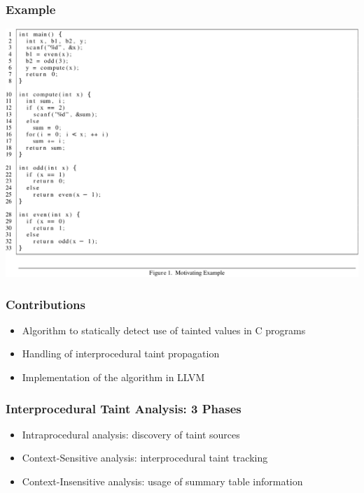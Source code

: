 \documentclass[xcolor=dvipsnames]{beamer}
\begin{document}
\begin{frame}
  \frametitle{Example} 
    {\small
	\begin{center}
	\includegraphics[scale=0.55]{example}
	\end{center}   
	}
\end{frame}

\begin{frame}
  \frametitle{Contributions} 
	{\Large
	\begin{itemize}
	\item Algorithm to statically detect use of tainted values in C programs
   	\vspace{0.5cm}
	\item Handling of interprocedural taint propagation
   	\vspace{0.5cm}   	
	\item Implementation of the algorithm in LLVM
	\end{itemize}
	}
\end{frame}

\begin{frame}
  \frametitle{Interprocedural Taint Analysis: 3 Phases} 
	{\Large
	\begin{itemize}
	\item Intraprocedural analysis: discovery of taint sources
   	\vspace{0.5cm}		
	\item Context-Sensitive analysis: interprocedural taint tracking
   	\vspace{0.5cm}		   	
	\item Context-Insensitive analysis: usage of summary table information
	\end{itemize}
}
\end{frame}
\end{document}
